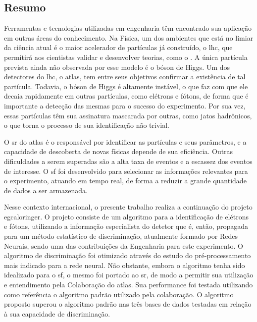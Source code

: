 \vfill
\begin{center}
\section*{Resumo\label{Resumo}}
\end{center}

Ferramentas e tecnologias utilizadas em engenharia têm encontrado sua
aplicação em outras áreas do conhecimento.
Na Física, um dos ambientes que está no limiar da ciência atual é o maior acelerador 
de partículas já construído, o \acrshort{lhc}, que permitirá aos
cientistas validar e desenvolver teorias, como o . A
única partícula prevista ainda não observada por esse modelo é o bóson
de Higgs. Um dos detectores do \acrshort{lhc}, o \acrshort{atlas}, tem entre seus objetivos 
confirmar a existência de tal partícula. Todavia, o bóson de Higgs é altamente
instável, o que faz com que ele decaia rapidamente em outras partículas, como elétrons e fótons, de forma que é importante 
a detecção das mesmas para o sucesso do experimento. Por sua vez, essas
partículas têm sua assinatura mascarada por outras, como jatos hadrônicos, o que
torna o processo de sua identificação não trivial. 

O \gls{sr} do \acrshort{atlas} é o responsável por identificar as
partículas e seus parâmetros, e a capacidade de descoberta de novas físicas 
depende de sua eficiência. Outras dificuldades a serem superadas são a alta taxa de
eventos e a escassez dos eventos de interesse. 
O \gls{sf} foi desenvolvido para selecionar as informações relevantes para o experimento, 
atuando em tempo real, de forma a reduzir a grande quantidade de dados a ser armazenada.

Nesse contexto internacional, o presente trabalho realiza a continuação
do projeto \acrshort{egcaloringer}. O projeto consiste de um algoritmo 
para a identificação de elétrons e fótons, utilizando a informação especialista 
do detetor que é, então, propagada para um método estatístico de discriminação, 
atualmente formado por Redes Neurais, sendo uma das contribuições da
Engenharia para este experimento. O algoritmo de discriminação foi otimizado 
através do estudo do pré-processamento mais indicado para a rede neural. 
Não obstante, embora o algoritmo tenha sido idealizado para o \gls{sf}, 
o mesmo foi portado ao \gls{sr}, de modo a permitir sua utilização e 
entendimento pela Colaboração do \acrshort{atlas}. Sua performance foi 
testada utilizando como referência o algoritmo padrão utilizado 
pela colaboração. O algoritmo proposto superou o algoritmo padrão nas três bases
de dados testadas em relação à sua capacidade de discriminação.

